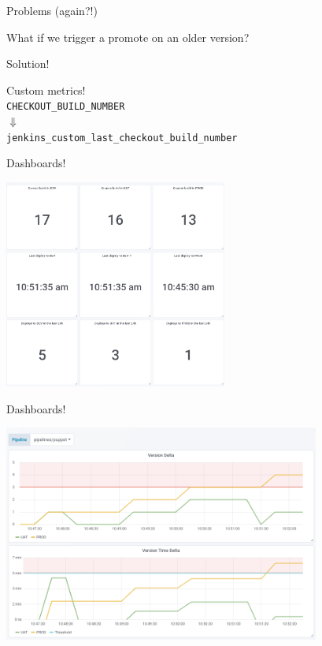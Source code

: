 \documentclass[aspectratio=169,12pt]{beamer}
\begin{document}
\begin{frame}[fragile]{Problems (again?!)}
  \begin{center}
    \Large What if we trigger a promote on an older version?
  \end{center}
\end{frame}

\begin{frame}[fragile]{Solution!}
  \begin{center}
    \large Custom metrics! \normalsize \\
    \vspace{20pt}
    \verb|CHECKOUT_BUILD_NUMBER|\\
    $\Downarrow$ \\
    \verb|jenkins_custom_last_checkout_build_number|
  \end{center}
\end{frame}

\begin{frame}{Dashboards!}
  \begin{center}
    \includegraphics[width=0.55\textwidth]{img/stats.png}
  \end{center}
\end{frame}

\begin{frame}{Dashboards!}
  \begin{center}
    \includegraphics[width=0.78\textwidth]{img/graphs.png}
  \end{center}
\end{frame}
\end{document}
